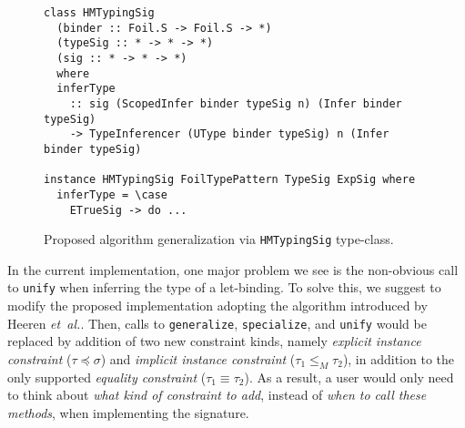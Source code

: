 \begin{figure}[H]
\begin{verbatim}
class HMTypingSig
  (binder :: Foil.S -> Foil.S -> *)
  (typeSig :: * -> * -> *)
  (sig :: * -> * -> *) 
  where
  inferType
    :: sig (ScopedInfer binder typeSig n) (Infer binder typeSig)
    -> TypeInferencer (UType binder typeSig) n (Infer binder typeSig)

instance HMTypingSig FoilTypePattern TypeSig ExpSig where
  inferType = \case
    ETrueSig -> do ...
\end{verbatim}
  \caption{Proposed algorithm generalization via \texttt{HMTypingSig} type-class.}
  \label{fig:HMTypingSig}
\end{figure}

In the current implementation, one major problem we see is the non-obvious call to \texttt{unify} when inferring the type of a let-binding. To solve this, we suggest to modify the proposed implementation adopting the algorithm introduced by Heeren \emph{et~al.}\cite{Heeren2002_GeneralizingHM}. Then, calls to \texttt{generalize}, \texttt{specialize}, and \texttt{unify} would be replaced by addition of two new constraint kinds, namely \emph{explicit instance constraint} ($\tau \preceq \sigma$) and \emph{implicit instance constraint} ($\tau_1 \leq_M \tau_2$), in addition to the only supported \emph{equality constraint} ($\tau_1 \equiv \tau_2$). As a result, a user would only need to think about \emph{what kind of constraint to add}, instead of \emph{when to call these methods}, when implementing the signature.

